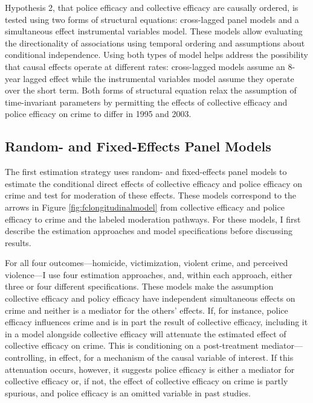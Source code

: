 \documentclass [11pt, proquest] {uwthesis}[2015/03/03]
\begin{document}
Hypothesis 2, that police efficacy and collective efficacy are causally ordered, is tested using two forms of structural equations: cross-lagged panel models and a simultaneous effect instrumental variables model. These models allow evaluating the directionality of associations using temporal ordering and assumptions about conditional independence. Using both types of model helps address the possibility that causal effects operate at different rates: cross-lagged models assume an 8-year lagged effect while the instrumental variables model assume they operate over the short term. Both forms of structural equation relax the assumption of time-invariant parameters by permitting the effects of collective efficacy and police efficacy on crime to differ in 1995 and 2003.

\hypertarget{random--and-fixed-effects-panel-models}{%
\subsection{Random- and Fixed-Effects Panel Models}\label{random--and-fixed-effects-panel-models}}

The first estimation strategy uses random- and fixed-effects panel models to estimate the conditional direct effects of collective efficacy and police efficacy on crime and test for moderation of these effects. These models correspond to the arrows in Figure \ref{fig:fclongitudinalmodel} from collective efficacy and police efficacy to crime and the labeled moderation pathways. For these models, I first describe the estimation approaches and model specifications before discussing results.

For all four outcomes---homicide, victimization, violent crime, and perceived violence---I use four estimation approaches, and, within each approach, either three or four different specifications. These models make the assumption collective efficacy and policy efficacy have independent simultaneous effects on crime and neither is a mediator for the others' effects. If, for instance, police efficacy influences crime and is in part the result of collective efficacy, including it in a model alongside collective efficacy will attenuate the estimated effect of collective efficacy on crime. This is conditioning on a post-treatment mediator---controlling, in effect, for a mechanism of the causal variable of interest. If this attenuation occurs, however, it suggests police efficacy is either a mediator for collective efficacy or, if not, the effect of collective efficacy on crime is partly spurious, and police efficacy is an omitted variable in past studies.
\end{document}
